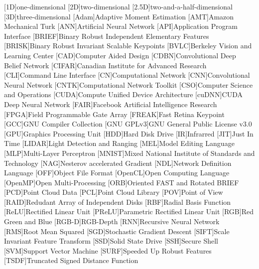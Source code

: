 \begin{acronym}
	[1D]{one-dimensional}
	[2D]{two-dimensional}
	[2.5D]{two-and-a-half-dimensional}
	[3D]{three-dimensional}
	[Adam]{Adaptive Moment Estimation}
	[AMT]{Amazon Mechanical Turk}
	[ANN]{Artificial Neural Network}
	[API]{Application Program Interface}
	[BRIEF]{Binary Robust Independent Elementary Features}
	[BRISK]{Binary Robust Invariant Scalable Keypoints}
	[BVLC]{Berkeley Vision and Learning Center}
	[CAD]{Computer Aided Design}
	[CDBN]{Convolutional Deep Belief Network}
	[CIFAR]{Canadian Institute for Advanced Research}
	[CLI]{Command Line Interface}
	[CN]{Computational Network}
	[CNN]{Convolutional Neural Network}
	[CNTK]{Computational Network Toolkit}
	[CSO]{Computer Science and Operations}
	[CUDA]{Compute Unified Device Architecture}
	[cuDNN]{CUDA Deep Neural Network}
	[FAIR]{Facebook Artificial Intelligence Research}
	[FPGA]{Field Programmable Gate Array}
	[FREAK]{Fast Retina Keypoint}
	[GCC]{GNU Compiler Collection}
	[GNU GPLv3]{GNU General Public License v3.0}
	[GPU]{Graphics Processing Unit}
	[HDD]{Hard Disk Drive}
	[IR]{Infrarred}
	[JIT]{Just In Time}
	[LIDAR]{Light Detection and Ranging}
	[MEL]{Model Editing Language}
	[MLP]{Multi-Layer Perceptron}
	[MNIST]{Mixed National Institute of Standards and Technology}
	[NAG]{Nesterov accelerated Gradient}
	[NDL]{Network Definition Language}
	[OFF]{Object File Format}
	[OpenCL]{Open Computing Language}
	[OpenMP]{Open Multi-Processing}
	[ORB]{Oriented FAST and Rotated BRIEF}
	[PCD]{Point Cloud Data}
	[PCL]{Point Cloud Library}
	[POV]{Point of View}
	[RAID]{Redudant Array of Independent Disks}
	[RBF]{Radial Basis Function}
	[ReLU]{Rectified Linear Unit}
	[PReLU]{Parametric Rectified Linear Unit}
	[RGB]{Red Green and Blue}
	[RGB-D]{RGB-Depth}
	[RNN]{Recursive Neural Network}
	[RMS]{Root Mean Squared}
	[SGD]{Stochastic Gradient Descent}
	[SIFT]{Scale Invariant Feature Transform}
	[SSD]{Solid State Drive}
	[SSH]{Secure Shell}
	[SVM]{Support Vector Machine}
	[SURF]{Speeded Up Robust Features}
	[TSDF]{Truncated Signed Distance Function}
\end{acronym}
